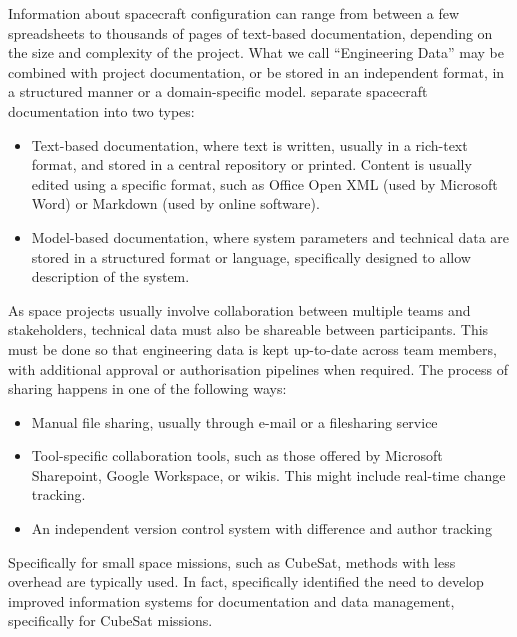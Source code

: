\documentclass[]{iac}
\def\todo#1{}
\begin{document}
Information about spacecraft configuration can range from between a few spreadsheets to thousands of pages of text-based documentation, depending on the size and complexity of the project. What we call ``Engineering Data'' may be combined with project documentation, or be stored in an independent format, in a structured manner or a domain-specific model.
\citeauthor{kanavouras_agile_2024} \autocite{kanavouras_agile_2024} separate spacecraft documentation into two types:
\begin{itemize}
    \item Text-based documentation, where text is written, usually in a rich-text format, and stored in a central repository or printed. Content is usually edited using a specific format, such as Office Open XML (used by Microsoft Word) or Markdown (used by online software).

    \item Model-based documentation, where system parameters and technical data are stored in a structured format or language, specifically designed to allow description of the system.
\end{itemize}

As space projects usually involve collaboration between multiple teams and stakeholders, technical data must also be shareable between participants. This %
must be done so that engineering data is kept up-to-date across team members, with additional approval or authorisation pipelines when required. The process of sharing happens in one of the following ways:
\begin{itemize}
    \item Manual file sharing, usually through e-mail or a filesharing service
    \item Tool-specific collaboration tools, such as those offered by Microsoft Sharepoint, Google Workspace, or wikis. This might include real-time change tracking.
    \item An independent version control system with difference and author tracking
\end{itemize}


Specifically for small space missions, such as CubeSat, methods with less overhead are typically used. \todo{These methods include but are not limited to:}
\autocite{honore-livermore_integrating_2022}
In fact, \citeauthor{honore-livermore_integrating_2022} \autocite{honore-livermore_integrating_2022} specifically identified the need to develop improved information systems for documentation and data management, specifically for CubeSat missions.
\end{document}

